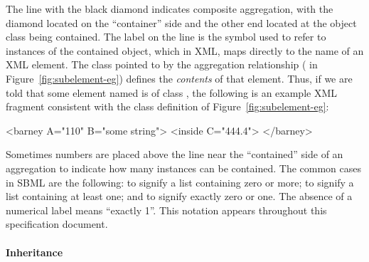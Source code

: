 The line with the black diamond indicates composite aggregation,
with the diamond located on the ``container'' side and the other
end located at the object class being contained.  The label on the
line is the symbol used to refer to instances of the contained
object, which in XML, maps directly to the name of an XML element.
The class pointed to by the aggregation relationship (
in Figure~\ref{fig:subelement-eg}) defines the \emph{contents} of
that element.  Thus, if we are told that some element named
 is of class , the following is an
example XML fragment consistent with the class definition of
Figure~\ref{fig:subelement-eg}:

\begin{example}
<barney A="110" B="some string">
    <inside C="444.4">
</barney>
\end{example}

Sometimes numbers are placed above the line near the ``contained''
side of an aggregation to indicate how many instances can be
contained.  The common cases in SBML are the following:
\token{[0..*]} to signify a list containing zero or more;
\token{[1..*]} to signify a list containing at least one; and
\token{[0..1]} to signify exactly zero or one.  The absence of a
numerical label means ``exactly 1''.  This notation appears
throughout this specification document.


\paragraph{Inheritance}

